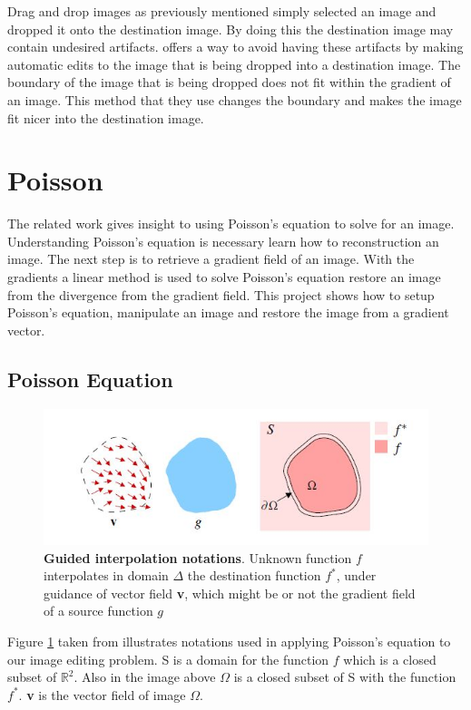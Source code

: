 \documentclass[10pt,twopage]{acmsiggraph}
\begin{document}
Drag and drop images as previously mentioned simply selected an image and dropped it onto the destination image. By doing this the destination image may contain undesired artifacts.\cite{ddp} offers a way to avoid having these artifacts by making automatic edits to the image that is being dropped into a destination image. The boundary of the image that is being dropped does not fit within the gradient of an image. This method that they use changes the boundary and makes the image fit nicer into the destination image.

\section{Poisson}

The related work gives insight to using Poisson's equation to solve for an image. Understanding Poisson's equation is necessary learn how to reconstruction an image. The next step is to retrieve a gradient field of an image. With the gradients a linear method is used to solve Poisson's equation restore an image from the divergence from the gradient field. This project shows how to setup Poisson's equation, manipulate an image and restore the image from a gradient vector.

\subsection{Poisson Equation}
\label{Poisson}

\begin{figure}[b]
\centering
\includegraphics[width=.44\textwidth]{fig/notations.jpg}
\caption{{\bf Guided interpolation notations}. Unknown function $f$ interpolates in domain \ensuremath{\Delta} the destination function $f^*$, under guidance of vector field {\bf v}, which might be or not the gradient field of a source function $g$}
\label{notations}
\end{figure}

Figure \ref{notations} taken from \cite{Perez} illustrates notations used in applying Poisson's equation to our image editing problem. S is a domain  for the function $f$ which is a closed subset of  \ensuremath{\mathbb{R}^2}. Also in the image above \ensuremath{\Omega} is a closed subset of S with the function $f^*$. {\bf v} is the vector field of image  \ensuremath{\Omega}. 
\end{document}
